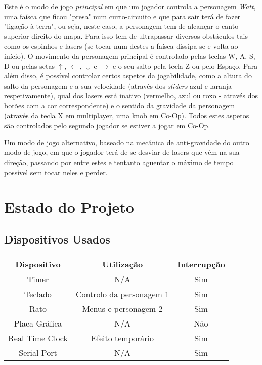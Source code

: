 \documentclass{report}
\begin{document}
Este é o modo de jogo \textit{principal} em que um jogador controla a personagem \textit{Watt}, uma faísca que ficou "presa" num curto-circuito e que para sair terá de fazer "ligação à terra", ou seja, neste caso, a personagem tem de alcançar o canto superior direito do mapa. Para isso tem de ultrapassar diversos obstáculos tais como os espinhos e lasers (se tocar num destes a faísca dissipa-se e volta ao início). \newline
O movimento da personagem principal é controlado pelas teclas W, A, S, D ou pelas setas $\uparrow$, $\leftarrow$, $\downarrow$ e $\rightarrow$ e o seu salto pela tecla Z ou pelo Espaço.
Para além disso, é possível controlar certos aspetos da jogabilidade, como a altura do salto da personagem e a sua velocidade (através dos \textit{sliders} azul e laranja respetivamente), qual dos lasers está inativo (vermelho, azul ou roxo - através dos botões com a cor correspondente) e o sentido da gravidade da personagem (através da tecla X em multiplayer, uma knob em Co-Op). Todos estes aspetos são controlados pelo segundo jogador se estiver a jogar em Co-Op.



Um modo de jogo alternativo, baseado na mecânica de anti-gravidade do outro modo de jogo, em que o jogador terá de se desviar de lasers que vêm na sua direção, passando por entre estes e tentanto aguentar o máximo de tempo possível sem tocar neles e perder.


\chapter{Estado do Projeto}

\section{Dispositivos Usados}

\begin{center}
	\begin{tabular}{ |c|c|c| } 
		\hline
			Dispositivo & Utilização & Interrupção \\ 
		\hline
		\hline
			Timer & N/A & Sim \\ 
			Teclado & Controlo da personagem 1 & Sim \\ 
			Rato & Menus e personagem 2 & Sim\\
			Placa Gráfica & N/A & Não\\
			Real Time Clock & Efeito temporário & Sim\\
			Serial Port & N/A & Sim \\
		\hline
	\end{tabular}
\end{center}
\end{document}
